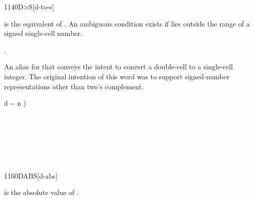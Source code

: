 \vspace*{-2ex}
\begin{worddef}[DtoS]{1140}{D>S}[d-to-s]
\item {}

	 is the equivalent of . An ambiguous condition
	exists if  lies outside the range of a signed single-cell
	number.

\see {}.

	\begin{rationale} %
		An alias for  that conveys the intent to convert
		a double-cell to a single-cell integer.  The original intention of this
		word was to support signed-number representations other than
		two's complement.
	\end{rationale}

	\begin{implement} %
		\word{:}   d -{}- n ) \\
		\tab {} \\
		\word{;} \\[1ex]
	\end{implement}

	\begin{testing} %
		 \\
		 \\
		 \\
	\end{testing}

\end{worddef}

\vspace*{-2ex}
\begin{worddef}{1160}{DABS}[d-abs]
\item {}

	 is the absolute value of .

	\begin{testing}
		 \\
		 \\
		 \\
	\end{testing}
\end{worddef}

